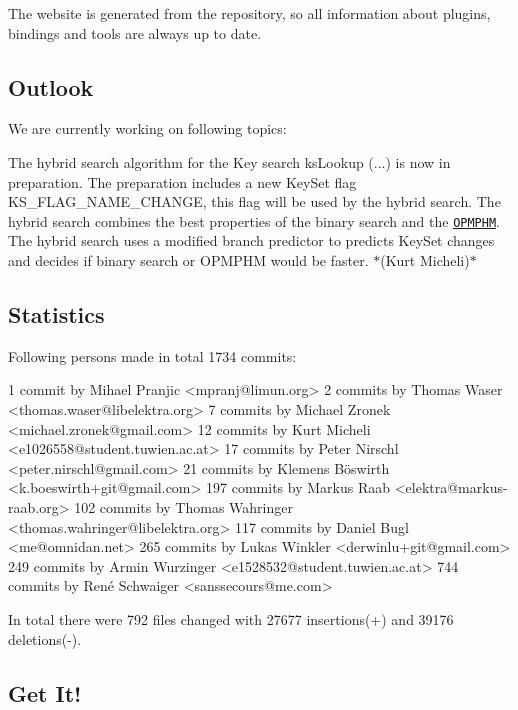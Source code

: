 The website is generated from the repository, so all information about plugins, bindings and tools are always up to date.

\subsection*{Outlook}

We are currently working on following topics\+:


\begin{DoxyItemize}
\item The hybrid search algorithm for the Key search {\ttfamily ks\+Lookup (...)} is now in preparation. The preparation includes a new Key\+Set flag {\ttfamily K\+S\+\_\+\+F\+L\+A\+G\+\_\+\+N\+A\+M\+E\+\_\+\+C\+H\+A\+N\+GE}, this flag will be used by the hybrid search. The hybrid search combines the best properties of the binary search and the \href{https://master.libelektra.org/doc/dev/data-structures.md#order-preserving-minimal-perfect-hash-map-aka-opmphm}{\tt O\+P\+M\+P\+HM}. The hybrid search uses a modified branch predictor to predicts Key\+Set changes and decides if binary search or O\+P\+M\+P\+HM would be faster. $\ast$(Kurt Micheli)$\ast$
\end{DoxyItemize}

\subsection*{Statistics}

Following persons made in total 1734 commits\+: \begin{DoxyVerb}  1 commit  by Mihael Pranjic <mpranj@limun.org>
  2 commits by Thomas Waser <thomas.waser@libelektra.org>
  7 commits by Michael Zronek <michael.zronek@gmail.com>
 12 commits by Kurt Micheli <e1026558@student.tuwien.ac.at>
 17 commits by Peter Nirschl <peter.nirschl@gmail.com>
 21 commits by Klemens Böswirth <k.boeswirth+git@gmail.com>
197 commits by Markus Raab <elektra@markus-raab.org>
102 commits by Thomas Wahringer <thomas.wahringer@libelektra.org>
117 commits by Daniel Bugl <me@omnidan.net>
265 commits by Lukas Winkler <derwinlu+git@gmail.com>
249 commits by Armin Wurzinger <e1528532@student.tuwien.ac.at>
744 commits by René Schwaiger <sanssecours@me.com>
\end{DoxyVerb}


In total there were 792 files changed with 27677 insertions(+) and 39176 deletions(-\/).

\subsection*{Get It!}


